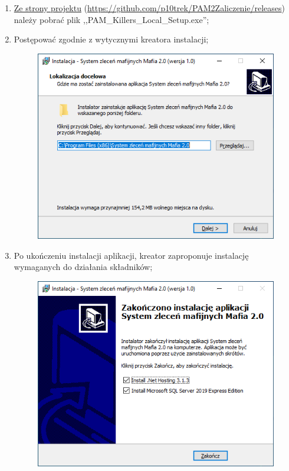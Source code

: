 \documentclass[12pt,a4paper]{article}
\begin{document}
			\begin{enumerate}
				\item \href{https://github.com/p10trek/PAM2Zaliczenie/releases}{Ze strony projektu} (\url{https://github.com/p10trek/PAM2Zaliczenie/releases}) należy pobrać plik
						,,PAM\_Killers\_Local\_Setup.exe'';
				\item Postępować zgodnie z wytycznymi kreatora instalacji;
				\begin{figure}[H]
					\includegraphics[scale=0.5]{img/Local_Install_1.png}
					\centering
				\end{figure}
				\item Po ukończeniu instalacji aplikacji, kreator zaproponuje instalację wymaganych do działania składników;
					\begin{figure}[H]
						\includegraphics[scale=0.5]{img/Local_Install_2.png}

\end{figure}
\end{enumerate}
\end{document}
